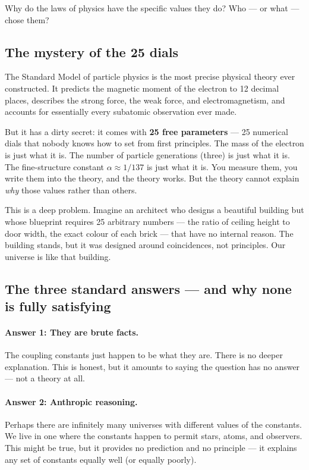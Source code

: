 \documentclass[11pt,a4paper]{article}
\begin{document}
\begin{tcolorbox}[colback=boxblue,colframe=blue!40!black,
  title=The central question]
Why do the laws of physics have the specific values they do?
Who — or what — chose them?
\end{tcolorbox}

\subsection{The mystery of the 25 dials}

The Standard Model of particle physics is the most precise physical theory ever
constructed.  It predicts the magnetic moment of the electron to 12 decimal places,
describes the strong force, the weak force, and electromagnetism, and accounts for
essentially every subatomic observation ever made.

But it has a dirty secret: it comes with \textbf{25 free parameters} — 25 numerical dials
that nobody knows how to set from first principles.  The mass of the electron is just
what it is.  The number of particle generations (three) is just what it is.
The fine-structure constant $\alpha \approx 1/137$ is just what it is.
You measure them, you write them into the theory, and the theory works.
But the theory cannot explain \emph{why} those values rather than others.

This is a deep problem.  Imagine an architect who designs a beautiful building but whose
blueprint requires 25 arbitrary numbers — the ratio of ceiling height to door width,
the exact colour of each brick — that have no internal reason.  The building stands, but
it was designed around coincidences, not principles.  Our universe is like that building.

\subsection{The three standard answers — and why none is fully satisfying}

\paragraph{Answer 1: They are brute facts.}
The coupling constants just happen to be what they are.
There is no deeper explanation.
This is honest, but it amounts to saying the question has no answer — not a theory at all.

\paragraph{Answer 2: Anthropic reasoning.}
Perhaps there are infinitely many universes with different values of the constants.
We live in one where the constants happen to permit stars, atoms, and observers.
This might be true, but it provides no prediction and no principle — it explains any set
of constants equally well (or equally poorly).
\end{document}
